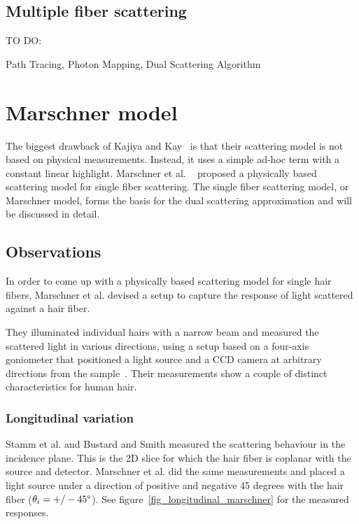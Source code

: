 \documentclass[11pt,a4paper]{report}
\begin{document}
\subsection{Multiple fiber scattering}

TO DO:

Path Tracing,
Photon Mapping,
Dual Scattering Algorithm

%
%

\section{Marschner model}
\label{sec_marschner}
%
%

The biggest drawback of Kajiya and Kay~\cite{kajiya} is that their scattering model is not based on physical measurements. Instead, it uses a simple ad-hoc term with a constant linear highlight. Marschner et al. ~\cite{marschner} proposed a physically based scattering model for single fiber scattering. The single fiber scattering model, or Marschner model, forms the basis for the dual scattering approximation and will be discussed in detail.


\subsection{Observations}
%
%
 
In order to come up with a physically based scattering model for single hair fibers, Marschner et al. devised a setup to capture the response of light scattered against a hair fiber. 

They illuminated individual hairs with a narrow beam and measured the scattered light in various directions, using a setup based on a four-axis goniometer that positioned a light source and a CCD camera at arbitrary directions from the sample~\cite{marschner}. Their measurements show a couple of distinct characteristics for human hair.

\subsubsection{Longitudinal variation}
\label{sec_longitudinal_observation}

Stamm et al. and Bustard and Smith measured the scattering behaviour in the incidence plane. This is the 2D slice for which the hair fiber is coplanar with the source and detector. Marschner et al. did the same measurements and placed a light source under a direction of positive and negative 45 degrees with the hair fiber ($\theta_i = +/- 45\degree$). See figure~\ref{fig_longitudinal_marschner} for the measured responses.
\end{document}

